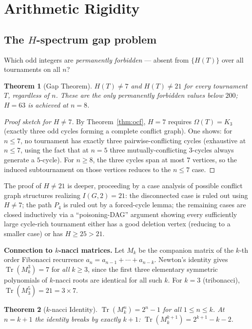 \documentclass[11pt,reqno]{amsart}
\theoremstyle{plain}
\newtheorem{thm}{Theorem}[section]
\theoremstyle{definition}
\theoremstyle{remark}
\newcommand{\Tr}{\operatorname{Tr}}
\begin{document}
\section{Arithmetic Rigidity}\label{sec:arith}

\subsection*{The $H$-spectrum gap problem}

Which odd integers are \emph{permanently forbidden} --- absent from $\{H(T)\}$
over all tournaments on all $n$?

\begin{thm}[Gap Theorem]\label{thm:gap}
$H(T)\ne 7$ and $H(T)\ne 21$ for every tournament $T$, regardless of $n$.
These are the only permanently forbidden values below $200$; $H=63$ is
achieved at $n=8$.
\end{thm}

\begin{proof}[Proof sketch for $H\ne 7$]
By Theorem~\ref{thm:ocf}, $H=7$ requires $\Omega(T)=K_3$ (exactly three odd
cycles forming a complete conflict graph).  One shows: for $n\le 7$, no
tournament has exactly three pairwise-conflicting cycles (exhaustive at $n\le 7$,
using the fact that at $n=5$ three mutually-conflicting $3$-cycles always
generate a $5$-cycle).  For $n\ge 8$, the three cycles span at most $7$
vertices, so the induced subtournament on those vertices reduces to the $n\le 7$
case.
\end{proof}

The proof of $H\ne 21$ is deeper, proceeding by a case analysis of possible
conflict graph structures realizing $I(G,2)=21$: the disconnected case is
ruled out using $H\ne 7$; the path $P_4$ is ruled out by a forced-cycle
lemma; the remaining cases are closed inductively via a ``poisoning-DAG''
argument showing every sufficiently large cycle-rich tournament either has
a good deletion vertex (reducing to a smaller case) or has $H\ge 25>21$.

\smallskip
\noindent\textbf{Connection to $k$-nacci matrices.}
Let $M_k$ be the companion matrix of the $k$-th order Fibonacci recurrence
$a_n=a_{n-1}+\cdots+a_{n-k}$.  Newton's identity gives
$\Tr(M_k^3)=7$ for \emph{all} $k\ge 3$, since the first three elementary
symmetric polynomials of $k$-nacci roots are identical for all such $k$.
For $k=3$ (tribonacci), $\Tr(M_3^5)=21=3\times 7$.

\begin{thm}[$k$-nacci Identity]\label{thm:mersenne}
$\Tr(M_k^n) = 2^n-1$ for all $1\le n\le k$.
At $n=k+1$ the identity breaks by exactly $k+1$: $\Tr(M_k^{k+1})=2^{k+1}-k-2$.
\end{thm}
\end{document}
